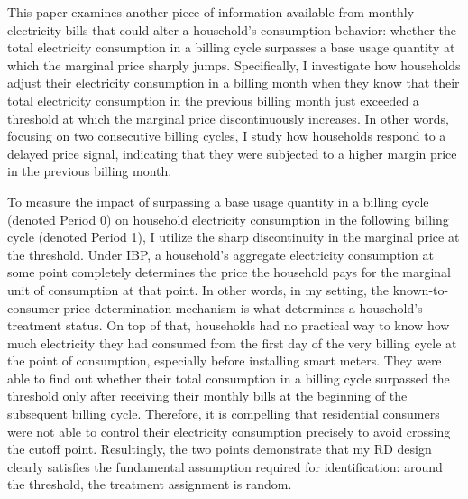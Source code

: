 This paper examines another piece of information available from monthly electricity bills that could alter a household's consumption behavior: whether the total electricity consumption in a billing cycle surpasses a base usage quantity at which the marginal price sharply jumps. Specifically, I investigate how households adjust their electricity consumption in a billing month when they know that their total electricity consumption in the previous billing month just exceeded a threshold at which the marginal price discontinuously increases. In other words, focusing on two consecutive billing cycles, I study how households respond to a delayed price signal, indicating that they were subjected to a higher margin price in the previous billing month. 

To measure the impact of surpassing a base usage quantity in a billing cycle (denoted Period 0) on household electricity consumption in the following billing cycle (denoted Period 1), I utilize the sharp discontinuity in the marginal price at the threshold. Under IBP, a household's aggregate electricity consumption at some point completely determines the price the household pays for the marginal unit of consumption at that point. In other words, in my setting, the known-to-consumer price determination mechanism is what determines a household's treatment status. On top of that, households had no practical way to know how much electricity they had consumed from the first day of the very billing cycle at the point of consumption, especially before installing smart meters. They were able to find out whether their total consumption in a billing cycle surpassed the threshold only after receiving their monthly bills at the beginning of the subsequent billing cycle. Therefore, it is compelling that residential consumers were not able to control their electricity consumption precisely to avoid crossing the cutoff point. Resultingly, the two points demonstrate that my RD design clearly satisfies the fundamental assumption required for identification: around the threshold, the treatment assignment is random. 

